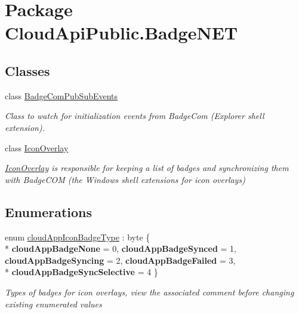 \hypertarget{namespace_cloud_api_public_1_1_badge_n_e_t}{\section{Package Cloud\-Api\-Public.\-Badge\-N\-E\-T}
\label{namespace_cloud_api_public_1_1_badge_n_e_t}
}
\subsection*{Classes}
\begin{DoxyCompactItemize}
\item 
class \hyperlink{class_cloud_api_public_1_1_badge_n_e_t_1_1_badge_com_pub_sub_events}{Badge\-Com\-Pub\-Sub\-Events}
\begin{DoxyCompactList}\small\item\em Class to watch for initialization events from Badge\-Com (Explorer shell extension). \end{DoxyCompactList}\item 
class \hyperlink{class_cloud_api_public_1_1_badge_n_e_t_1_1_icon_overlay}{Icon\-Overlay}
\begin{DoxyCompactList}\small\item\em \hyperlink{class_cloud_api_public_1_1_badge_n_e_t_1_1_icon_overlay}{Icon\-Overlay} is responsible for keeping a list of badges and synchronizing them with Badge\-C\-O\-M (the Windows shell extensions for icon overlays) \end{DoxyCompactList}\end{DoxyCompactItemize}
\subsection*{Enumerations}
\begin{DoxyCompactItemize}
\item 
enum \hyperlink{namespace_cloud_api_public_1_1_badge_n_e_t_afab91a750338fef6bd4ef08f5381c4e4}{cloud\-App\-Icon\-Badge\-Type} \-: byte \{ \\*
{\bfseries cloud\-App\-Badge\-None} = 0, 
{\bfseries cloud\-App\-Badge\-Synced} = 1, 
{\bfseries cloud\-App\-Badge\-Syncing} = 2, 
{\bfseries cloud\-App\-Badge\-Failed} = 3, 
\\*
{\bfseries cloud\-App\-Badge\-Sync\-Selective} = 4
 \}
\begin{DoxyCompactList}\small\item\em Types of badges for icon overlays, view the associated comment before changing existing enumerated values \end{DoxyCompactList}\end{DoxyCompactItemize}


